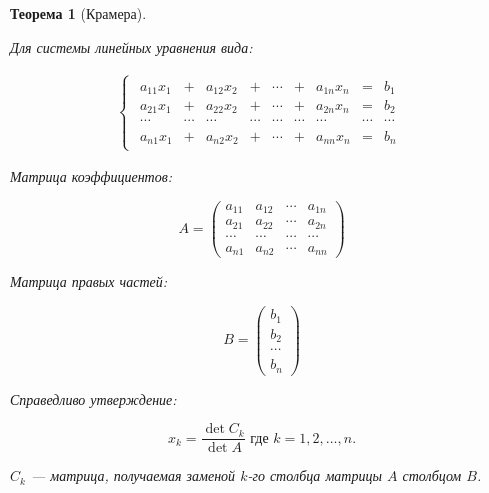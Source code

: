 \documentclass[a4paper,12pt,oneside]{extbook}
\newcommand{\newpar}{$ $\par\nobreak\ignorespaces}
\theoremstyle{numbered}
\theoremstyle{unnumbered}
\newtheorem*{theorem*}{Теорема}
\theoremstyle{named}
\theoremstyle{unnumbered}
\theoremstyle{named}
\theoremstyle{named}
\theoremstyle{named}
\begin{document}
\begin{theorem*}[Крамера]
    \newpar
    Для системы линейных уравнения вида:

    \begin{gather*}
        \begin{cases}
            \begin{matrix}
                a_{11}x_1 & +      & a_{12}x_2 & +      & \cdots & +      & a_{1n}x_n & =      & b_1    \\
                a_{21}x_1 & +      & a_{22}x_2 & +      & \cdots & +      & a_{2n}x_n & =      & b_2    \\
                \cdots    & \cdots & \cdots    & \cdots & \cdots & \cdots & \cdots    & \cdots & \cdots \\
                a_{n1}x_1 & +      & a_{n2}x_2 & +      & \cdots & +      & a_{nn}x_n & =      & b_n
            \end{matrix}
        \end{cases}
    \end{gather*}

    Матрица коэффициентов:

    \begin{equation*}
        A = \left(
        \begin{array}{cccc}
            a_{11} & a_{12} & \cdots & a_{1n} \\
            a_{21} & a_{22} & \cdots & a_{2n} \\
            \cdots & \cdots & \cdots & \cdots \\
            a_{n1} & a_{n2} & \cdots & a_{nn}
        \end{array}
        \right)
    \end{equation*}

    Матрица правых частей:

    \begin{equation*}
        B = \left(
        \begin{array}{cccc}
            b_{1}  \\
            b_{2}  \\
            \cdots \\
            b_{n}
        \end{array}
        \right)
    \end{equation*}

    Справедливо утверждение:

    \begin{equation*}
        x_k = \frac{\det C_k}{\det A} \text{ где } k = 1, 2, \dots, n.
    \end{equation*}

    \(C_k\) — матрица, получаемая заменой \(k\)-го столбца матрицы \(A\) столбцом \(B\).
\end{theorem*}
\end{document}
